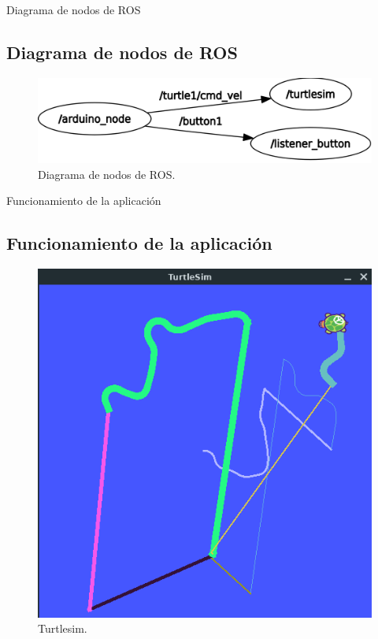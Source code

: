 \documentclass[xcolor=x11names,t]{beamer}
\begin{document}
\begin{frame}{Diagrama de nodos de ROS}    
    \subsection{Diagrama de nodos de ROS}
    \begin{figure}
        \vspace{1.5cm}
        \centering
        \includegraphics[scale=0.25]{images/rqtgraph.png}
        \caption{Diagrama de nodos de ROS.}
        \label{fig:rqtgraph}
    \end{figure}
\end{frame}

\begin{frame}{Funcionamiento de la aplicación}
    \subsection{Funcionamiento de la aplicación}
    \begin{figure}
        \centering
        \includegraphics[scale=0.45]{images/turtlesim.png}
        \caption{Turtlesim.}
        \label{fig:turtlesim}
    \end{figure}
\end{frame}
    
\end{document}
